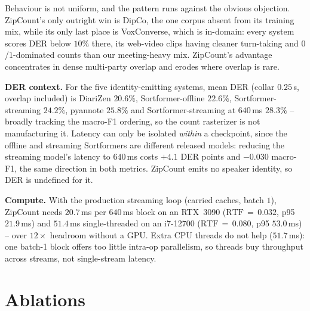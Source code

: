 \documentclass[10pt,conference]{IEEEtran}
\newcommand{\sys}{ZipCount}
\begin{document}
Behaviour is not uniform, and the pattern runs against the obvious
objection. \sys{}'s only outright win is DipCo, the one corpus absent from
its training mix, while its only last place is VoxConverse, which is
in-domain: every system scores DER below $10\%$ there, its web-video clips
having cleaner turn-taking and $0$/$1$-dominated counts than our
meeting-heavy mix. \sys{}'s advantage concentrates in dense multi-party
overlap and erodes where overlap is rare.

\textbf{DER context.} For the five identity-emitting systems, mean DER
(collar $0.25$\,s, overlap included) is DiariZen $20.6\%$,
Sortformer-offline $22.6\%$, Sortformer-streaming $24.2\%$, pyannote
$25.8\%$ and Sortformer-streaming at $640$\,ms $28.3\%$ -- broadly tracking
the macro-F1 ordering, so the count rasterizer is not manufacturing it.
Latency can only be isolated \emph{within} a checkpoint, since the offline
and streaming Sortformers are different released models: reducing the
streaming model's latency to $640$\,ms costs $+4.1$ DER points and $-0.030$
macro-F1, the same direction in both metrics. \sys{} emits no speaker
identity, so DER is undefined for it.

\textbf{Compute.} With the production streaming loop (carried caches, batch
$1$), \sys{} needs $20.7$\,ms per $640$\,ms block on an RTX~3090
($\mathrm{RTF}\,{=}\,0.032$, p95 $21.9$\,ms) and $51.4$\,ms single-threaded
on an i7-12700 ($\mathrm{RTF}\,{=}\,0.080$, p95 $53.0$\,ms) -- over
$12\times$ headroom without a GPU. Extra CPU threads do not help
($51.7$\,ms): one batch-1 block offers too little intra-op parallelism, so
threads buy throughput across streams, not single-stream latency.

\section{Ablations}
\label{sec:ablation}
\end{document}
